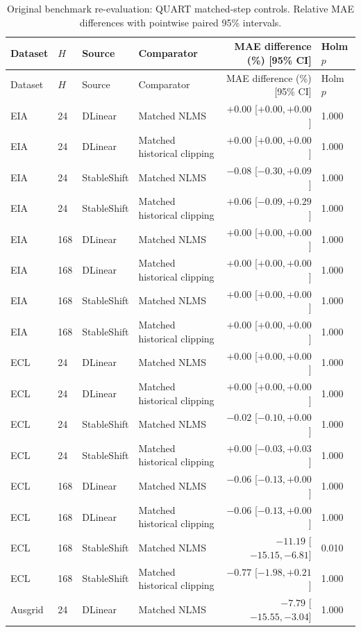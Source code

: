\begin{longtable}{lllp{}rp{}}
\caption{Original benchmark re-evaluation: QUART matched-step controls. Relative MAE differences with pointwise paired 95\% intervals.}\label{tab:test_matched_mechanism}\\
\toprule
Dataset & $H$ & Source & Comparator & MAE difference (\%) [95\% CI] & Holm $p$\\
\midrule
\endfirsthead
\toprule
Dataset & $H$ & Source & Comparator & MAE difference (\%) [95\% CI] & Holm $p$\\
\midrule
\endhead
EIA & 24 & DLinear & Matched NLMS & $+0.00$ [$ +0.00, +0.00 $] & 1.000\\
EIA & 24 & DLinear & Matched historical clipping & $+0.00$ [$ +0.00, +0.00 $] & 1.000\\
EIA & 24 & StableShift & Matched NLMS & $-0.08$ [$ -0.30, +0.09 $] & 1.000\\
EIA & 24 & StableShift & Matched historical clipping & $+0.06$ [$ -0.09, +0.29 $] & 1.000\\
EIA & 168 & DLinear & Matched NLMS & $+0.00$ [$ +0.00, +0.00 $] & 1.000\\
EIA & 168 & DLinear & Matched historical clipping & $+0.00$ [$ +0.00, +0.00 $] & 1.000\\
EIA & 168 & StableShift & Matched NLMS & $+0.00$ [$ +0.00, +0.00 $] & 1.000\\
EIA & 168 & StableShift & Matched historical clipping & $+0.00$ [$ +0.00, +0.00 $] & 1.000\\
ECL & 24 & DLinear & Matched NLMS & $+0.00$ [$ +0.00, +0.00 $] & 1.000\\
ECL & 24 & DLinear & Matched historical clipping & $+0.00$ [$ +0.00, +0.00 $] & 1.000\\
ECL & 24 & StableShift & Matched NLMS & $-0.02$ [$ -0.10, +0.00 $] & 1.000\\
ECL & 24 & StableShift & Matched historical clipping & $+0.00$ [$ -0.03, +0.03 $] & 1.000\\
ECL & 168 & DLinear & Matched NLMS & $-0.06$ [$ -0.13, +0.00 $] & 1.000\\
ECL & 168 & DLinear & Matched historical clipping & $-0.06$ [$ -0.13, +0.00 $] & 1.000\\
ECL & 168 & StableShift & Matched NLMS & $-11.19$ [$ -15.15, -6.81 $] & 0.010\\
ECL & 168 & StableShift & Matched historical clipping & $-0.77$ [$ -1.98, +0.21 $] & 1.000\\
Ausgrid & 24 & DLinear & Matched NLMS & $-7.79$ [$ -15.55, -3.04 $] & 1.000\\

\end{longtable}
